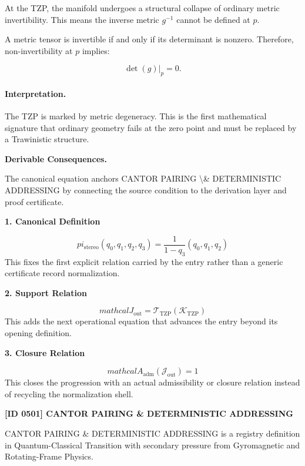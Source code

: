 At the TZP, the manifold undergoes a structural collapse of ordinary metric invertibility. This means the inverse metric $g^{-1}$ cannot be defined at $p$.

A metric tensor is invertible if and only if its determinant is nonzero. Therefore, non-invertibility at $p$ implies:

\begin{equation}
\det(g)\big|_{p}=0 .
\end{equation}

\paragraph{Interpretation.}
The TZP is marked by metric degeneracy. This is the first mathematical signature that ordinary geometry fails at the zero point and must be replaced by a Trawinistic structure.

\par\vspace{0.35em}
\noindent\textbf{Derivable Consequences.}\quad
\begingroup
\footnotesize
\raggedright
The canonical equation anchors CANTOR PAIRING \textbackslash{}\& DETERMINISTIC ADDRESSING by connecting the source condition to the derivation layer and proof certificate.
\par\endgroup

\noindent\textbf{1. Canonical Definition}\par
\[
pi_{ \text{stereo}}(q_0, q_1, q_2, q_3) = \frac{1}{1 - q_3}(q_0, q_1, q_2)
\]
\noindent This fixes the first explicit relation carried by the entry rather than a generic certificate record normalization.\par
\noindent\textbf{2. Support Relation}\par
\[
mathcal{J}_{\mathrm{out}} = \mathcal{T}_{\mathrm{TZP}}\!\left(\mathcal{K}_{\mathrm{TZP}}\right)
\]
\noindent This adds the next operational equation that advances the entry beyond its opening definition.\par
\noindent\textbf{3. Closure Relation}\par
\[
mathcal{A}_{\mathrm{adm}}\!\left(\mathcal{J}_{\mathrm{out}}\right)=1
\]
\noindent This closes the progression with an actual admissibility or closure relation instead of recycling the normalization shell.\par

\clearpage
\noindent\textbf{[ID 0501] CANTOR PAIRING \& DETERMINISTIC ADDRESSING}\par
\vspace{0.35em}
\begingroup\small
{}
CANTOR PAIRING \& DETERMINISTIC ADDRESSING is a registry definition in Quantum-Classical Transition with secondary pressure from Gyromagnetic and Rotating-Frame Physics.

